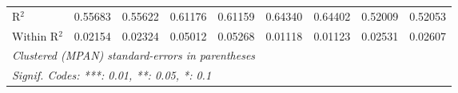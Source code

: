 \begin{table}[htbp]
\begin{tabular}{lcccccccc}
      R$^2$                          & 0.55683       & 0.55622       & 0.61176       & 0.61159       & 0.64340        & 0.64402        & 0.52009        & 0.52053\\  
      Within R$^2$                   & 0.02154       & 0.02324       & 0.05012       & 0.05268       & 0.01118        & 0.01123        & 0.02531        & 0.02607\\  
      \midrule \midrule
      \multicolumn{9}{l}{\emph{Clustered (MPAN) standard-errors in parentheses}}\\
      \multicolumn{9}{l}{\emph{Signif. Codes: ***: 0.01, **: 0.05, *: 0.1}}\\
   \end{tabular}
\end{table}



